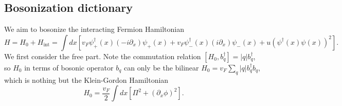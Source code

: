 \documentclass{SciPost}
\begin{document}
\subsection{Bosonization dictionary}
We aim to bosonize the interacting Fermion Hamiltonian
\begin{equation*}
	H = H_0 + H_\text{int} = \int dx \left[v_F\psi^\dagger_+(x)(-i\partial_x)\psi_+(x) +v_F\psi_-^\dagger(x)(i\partial_x)\psi_-(x) + u(\psi^\dagger(x)\psi(x))^2 \right].
\end{equation*}
We first consider the free part.
Note the commutation relation $[H_0,b_{q}^\dagger] = |q| b_{q}^\dagger$, so $H_0$ in terms of bosonic operator $b_q$ can only be the bilinear $H_0 = v_F \sum_{q} |q| b^\dagger_q b_q$, which is nothing but the Klein-Gordon Hamiltonian 
\begin{equation}
	H_0 = \frac{v_F}{2} \int dx [\Pi^2+(\partial_x\phi)^2].
\end{equation}
\end{document}
